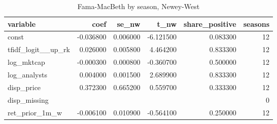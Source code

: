 \begin{table}
\caption{Fama-MacBeth by season, Newey-West}
\label{tab:t8_fama_macbeth__tfidf_logit__up__car_0_1_ff4__validation}
\begin{tabular}{lrrrrr}
\toprule
variable & coef & se\_nw & t\_nw & share\_positive & seasons \\
\midrule
const & -0.036800 & 0.006000 & -6.121500 & 0.083300 & 12 \\
tfidf\_logit\_\_up\_rk & 0.026000 & 0.005800 & 4.464200 & 0.833300 & 12 \\
log\_mktcap & -0.000300 & 0.000800 & -0.360700 & 0.500000 & 12 \\
log\_analysts & 0.004000 & 0.001500 & 2.689900 & 0.833300 & 12 \\
disp\_price & 0.372300 & 0.665200 & 0.559700 & 0.333300 & 12 \\
disp\_missing &  &  &  &  & 0 \\
ret\_prior\_1m\_w & -0.006100 & 0.010900 & -0.564100 & 0.250000 & 12 \\
\bottomrule
\end{tabular}
\end{table}
